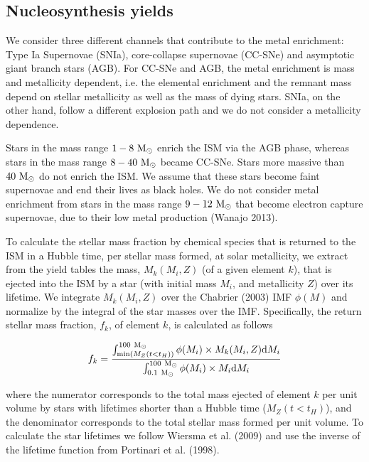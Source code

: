 \documentclass[11pt,a4paper,fleqn,usenatbib,twocolumn]{mnras}
\begin{document}
\subsection{Nucleosynthesis yields}

We consider three different channels that contribute to the metal enrichment: Type Ia Supernovae (SNIa), core-collapse supernovae (CC-SNe) and asymptotic giant branch stars (AGB). For CC-SNe and AGB, the metal enrichment is mass and metallicity dependent, i.e. the elemental enrichment and the remnant mass depend on stellar metallicity as well as the mass of dying stars. SNIa, on the other hand, follow a different explosion path and we do not consider a metallicity dependence. 

Stars in the mass range $1-8~\rm{M}_{\odot}$ enrich the ISM via the AGB phase, whereas stars in the mass range $8-40~\rm{M}_{\odot}$ became CC-SNe. Stars more massive than $40~\rm{M}_{\odot}$ do not enrich the ISM. We assume that these stars become faint supernovae and end their lives as black holes. We do not consider metal enrichment from stars in the mass range $9-12~\rm{M}_{\odot}$ that become electron capture supernovae, due to their low metal production (Wanajo 2013). 

To calculate the stellar mass fraction by chemical species that is returned to the ISM in a Hubble time, per stellar mass formed, at solar metallicity, we extract from the yield tables the mass, $M_{k}(M_{i},Z)$ (of a given element $k$), that is ejected into the ISM by a star (with initial mass $M_{i}$, and metallicity $Z$) over its lifetime. We integrate $M_{k}(M_{i},Z)$ over the Chabrier (2003) IMF $\phi(M)$ and normalize by the integral of the star masses over the IMF. Specifically, the return stellar mass fraction, $f_{k}$, of element $k$, is calculated as follows

\begin{equation}
f_{k} = \frac{\int_{{\rm{min}}(M_{Z}(t<t_{H}))}^{100~{\rm{M}}_{\odot}}  \phi(M_{i})\times M_{k}(M_{i},Z) {\rm{d}}M_{i}}{\int_{0.1~{\rm{M}}_{\odot}}^{100~{\rm{M}}_{\odot}} \phi(M_{i})\times M_{i}{\rm{d}}M_{i}}
\end{equation}

\noindent where the numerator corresponds to the total mass ejected of element $k$ per unit volume by stars with lifetimes shorter than a Hubble time ($M_{Z}(t<t_{H})$), and the denominator corresponds to the total stellar mass formed per unit volume. To calculate the star lifetimes we follow Wiersma et al. (2009) and use the inverse of the lifetime function from Portinari et al. (1998).
\end{document}
